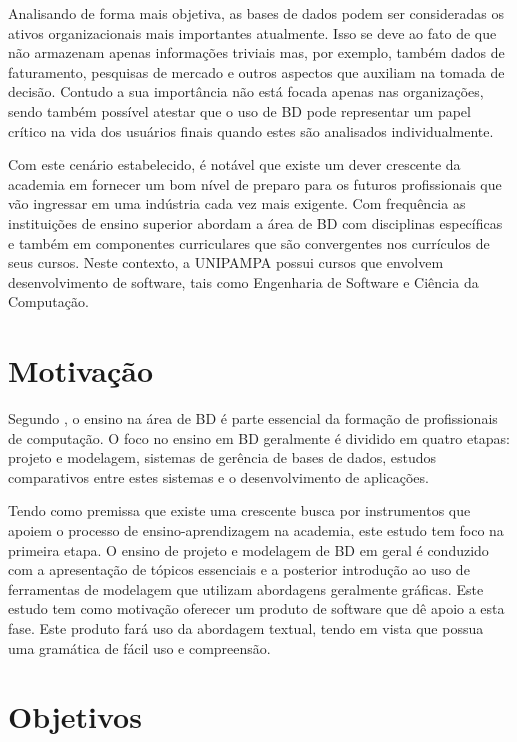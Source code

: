Analisando de forma mais objetiva, as bases de dados podem ser consideradas os ativos organizacionais mais importantes atualmente. 
Isso se deve ao fato de que não armazenam apenas informações triviais mas, por exemplo, também dados de faturamento, pesquisas de mercado e outros aspectos que auxiliam na tomada de decisão. 
Contudo a sua importância não está focada apenas nas organizações, sendo também possível atestar que o uso de \ac{BD} pode representar um papel crítico na vida dos usuários finais quando estes são analisados individualmente. 

Com este cenário estabelecido, é notável que existe um dever crescente da academia em fornecer um bom nível de preparo para os futuros profissionais que vão ingressar em uma indústria cada vez mais exigente. 
Com frequência as instituições de ensino superior abordam a área de \ac{BD} com disciplinas específicas e também em componentes curriculares que são convergentes nos currículos de seus cursos. 
Neste contexto, a UNIPAMPA possui cursos que envolvem desenvolvimento de software, tais como Engenharia de Software e Ciência da Computação.

\section{Motivação}

Segundo , o ensino na área de \ac{BD} é parte essencial da formação de profissionais de computação. 
O foco no ensino em \ac{BD} geralmente é dividido em quatro etapas: projeto e modelagem, sistemas de gerência de bases de dados, estudos comparativos entre estes sistemas e o desenvolvimento de aplicações. 

Tendo como premissa que existe uma crescente busca por instrumentos que apoiem o processo de ensino-aprendizagem na academia, este estudo tem foco na primeira etapa. 
O ensino de projeto e modelagem de \ac{BD} em geral é conduzido com a apresentação de tópicos essenciais e a posterior introdução ao uso de ferramentas de modelagem que utilizam abordagens geralmente gráficas. 
Este estudo tem como motivação oferecer um produto de software que dê apoio a esta fase. 
Este produto fará uso da abordagem textual, tendo em vista que possua uma gramática de fácil uso e compreensão.

\section{Objetivos}

